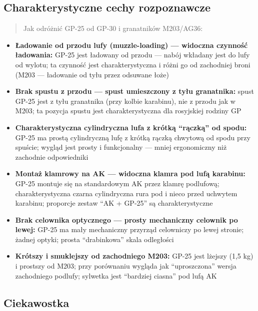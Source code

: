 \documentclass[12pt,oneside]{book}
\providecommand{\tightlist}{%
  \setlength{\itemsep}{0pt}\setlength{\parskip}{0pt}}
\begin{document}
\subsection{Charakterystyczne cechy
rozpoznawcze}\label{charakterystyczne-cechy-rozpoznawcze-94}

\begin{quote}
Jak odróżnić GP-25 od GP-30 i granatników M203/AG36:
\end{quote}

\begin{itemize}
\tightlist
\item
  \textbf{Ładowanie od przodu lufy (muzzle-loading) --- widoczna
  czynność ładowania:} GP-25 jest ładowany od przodu --- nabój wkładany
  jest do lufy od wylotu; ta czynność jest charakterystyczna i różni go
  od zachodniej broni (M203 --- ładowanie od tyłu przez odsuwane łoże)
\item
  \textbf{Brak spustu z przodu --- spust umieszczony z tyłu granatnika:}
  spust GP-25 jest z tyłu granatnika (przy kolbie karabinu), nie z
  przodu jak w M203; ta pozycja spustu jest charakterystyczna dla
  rosyjskiej rodziny GP
\item
  \textbf{Charakterystyczna cylindryczna lufa z krótką ``rączką'' od
  spodu:} GP-25 ma prostą cylindryczną lufę z krótką rączką chwytową od
  spodu przy spuście; wygląd jest prosty i funkcjonalny --- mniej
  ergonomiczny niż zachodnie odpowiedniki
\item
  \textbf{Montaż klamrowy na AK --- widoczna klamra pod lufą karabinu:}
  GP-25 montuje się na standardowym AK przez klamrę podlufową;
  charakterystyczna czarna cylindryczna rura pod i nieco przed uchwytem
  karabinu; proporcje zestaw ``AK + GP-25'' są charakterystyczne
\item
  \textbf{Brak celownika optycznego --- prosty mechaniczny celownik po
  lewej:} GP-25 ma mały mechaniczny przyrząd celowniczy po lewej
  stronie; żadnej optyki; prosta ``drabinkowa'' skala odległości
\item
  \textbf{Krótszy i smuklejszy od zachodniego M203:} GP-25 jest lżejszy
  (1,5 kg) i prostszy od M203; przy porównaniu wygląda jak
  ``uproszczona'' wersja zachodniego podlufy; sylwetka jest ``bardziej
  ciasna'' pod lufą AK
\end{itemize}

\subsection{Ciekawostka}\label{ciekawostka-94}
\end{document}
